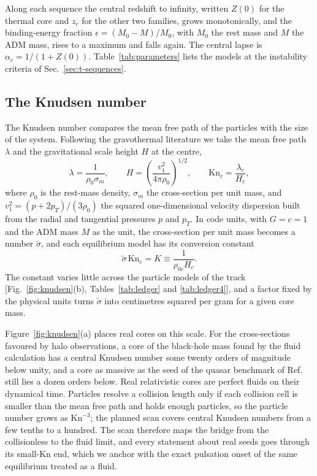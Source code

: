 \documentclass[aps,prd,twocolumn,10pt,superscriptaddress,nofootinbib,longbibliography,floatfix]{revtex4-2}
\newcommand{\Kn}{\mathrm{Kn}}
\newcommand{\sigmam}{\sigma_m}
\newcommand{\sigt}{\tilde\sigma}
\begin{document}
Along each sequence the central redshift to infinity, written $Z(0)$ for the thermal core and $z_c$ for the other two families, grows monotonically, and the binding-energy fraction $\epsilon=(M_0-M)/M_0$, with $M_0$ the rest mass and $M$ the ADM mass, rises to a maximum and falls again. The central lapse is $\alpha_c=1/(1+Z(0))$. Table~\ref{tab:parameters} lists the models at the instability criteria of Sec.~\ref{sec:t-sequences}.

\subsection{The Knudsen number}\label{sec:knudsen}

The Knudsen number compares the mean free path of the particles with the size of the system. Following the gravothermal literature \cite{Balberg:2002gt,Gu:2026sidm} we take the mean free path $\lambda$ and the gravitational scale height $H$ at the centre,
\begin{equation}\label{eq:kn}
\lambda=\frac{1}{\rho_0\sigmam},\qquad H=\left(\frac{v_1^2}{4\pi\rho_0}\right)^{1/2},\qquad \Kn_c=\frac{\lambda_c}{H_c},
\end{equation}
where $\rho_0$ is the rest-mass density, $\sigmam$ the cross-section per unit mass, and $v_1^2=(p+2p_T)/(3\rho_0)$ the squared one-dimensional velocity dispersion built from the radial and tangential pressures $p$ and $p_T$. In code units, with $G=c=1$ and the ADM mass $M$ as the unit, the cross-section per unit mass becomes a number $\sigt$, and each equilibrium model has its conversion constant
\begin{equation}\label{eq:conversion}
\sigt\,\Kn_c=K\equiv\frac{1}{\rho_{0c}H_c}.
\end{equation}
The constant varies little across the particle models of the track [Fig.~\ref{fig:knudsen}(b), Tables~\ref{tab:ledger} and \ref{tab:ledger4}], and a factor fixed by the physical units turns $\sigt$ into centimetres squared per gram for a given core mass.

Figure~\ref{fig:knudsen}(a) places real cores on this scale. For the cross-sections favoured by halo observations, a core of the black-hole mass found by the fluid calculation \cite{Gu:2026sidm} has a central Knudsen number some twenty orders of magnitude below unity, and a core as massive as the seed of the quasar benchmark of Ref.~\cite{Feng:2021instab} still lies a dozen orders below. Real relativistic cores are perfect fluids on their dynamical time. Particles resolve a collision length only if each collision cell is smaller than the mean free path and holds enough particles, so the particle number grows as $\Kn^{-3}$; the planned scan covers central Knudsen numbers from a few tenths to a hundred. The scan therefore maps the bridge from the collisionless to the fluid limit, and every statement about real seeds goes through its small-$\Kn$ end, which we anchor with the exact pulsation onset of the same equilibrium treated as a fluid.
\end{document}
